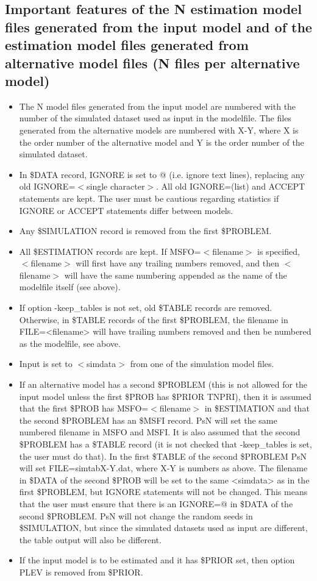 \subsection{Important features of the N estimation model files generated from the input model and of the estimation model files generated from alternative model files (N files per alternative model)}
\begin{itemize}
	\item The N model files generated from the input model are numbered with the number of the simulated dataset used as input in the modelfile. The files generated from the alternative models are numbered with X-Y, where X is the order number of the alternative model and Y is the order number of the simulated dataset.
	\item In \$DATA record, IGNORE is set to @ (i.e. ignore text lines), replacing any old IGNORE=$<$single character$>$. All old IGNORE=(list) and ACCEPT statements are kept. The user must be cautious regarding statistics if IGNORE or ACCEPT statements differ between models.
	\item Any \$SIMULATION record is removed from the first \$PROBLEM.
	\item All \$ESTIMATION records are kept. If MSFO=$<$filename$>$ is specified, $<$filename$>$ will first have any trailing numbers removed, and then $<$filename$>$ will have the same numbering appended as the name of the modelfile itself (see above).
	\item If option -keep\_tables is not set, old \$TABLE records are removed. Otherwise, in \$TABLE records of the first \$PROBLEM, the filename in FILE=<filename> will have trailing numbers removed and then be numbered as the modelfile, see above. 
	\item Input is set to $<$simdata$>$ from one of the simulation model files. 
	\item If an alternative model has a second \$PROBLEM (this is not allowed for the input model unless the first \$PROB has \$PRIOR TNPRI), then it is assumed that the first \$PROB has MSFO=$<$filename$>$ in \$ESTIMATION and that the second \$PROBLEM has an \$MSFI record. PsN will set the same numbered filename in MSFO and MSFI. It is also assumed that the second \$PROBLEM has a \$TABLE record (it is not checked that -keep\_tables is set, the user must do that). In the first \$TABLE of the second \$PROBLEM PsN will set FILE=simtabX-Y.dat, where X-Y is numbers as above. The filename in \$DATA of the second \$PROB will be set to the same <simdata> as in the first \$PROBLEM, but IGNORE statements will not be changed. This means that the user must ensure that there is an IGNORE=@ in \$DATA of the second \$PROBLEM. PsN will not change the random seeds in \$SIMULATION, but since the simulated datasets used as input are different, the table output will also be different.
	\item If the input model is to be estimated and it has \$PRIOR set, then option PLEV is removed from \$PRIOR.
\end{itemize}


